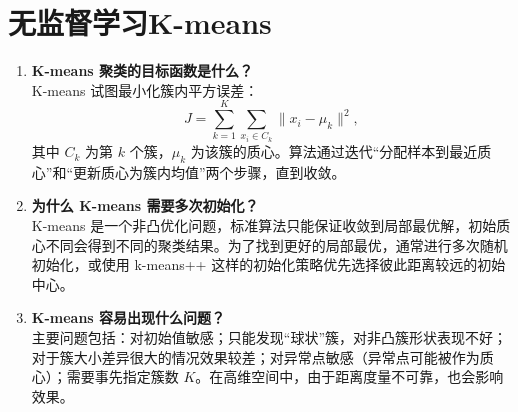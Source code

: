 \documentclass{article}
\begin{document}
\section{无监督学习K-means}
\begin{enumerate}
\item \textbf{K-means 聚类的目标函数是什么？}\\
K-means 试图最小化簇内平方误差：
\[
J = \sum_{k=1}^K \sum_{x_i \in C_k} \|x_i - \mu_k\|^2,
\]
其中 $C_k$ 为第 $k$ 个簇，$\mu_k$ 为该簇的质心。算法通过迭代“分配样本到最近质心”和“更新质心为簇内均值”两个步骤，直到收敛。

\item \textbf{为什么 K-means 需要多次初始化？}\\
K-means 是一个非凸优化问题，标准算法只能保证收敛到局部最优解，初始质心不同会得到不同的聚类结果。为了找到更好的局部最优，通常进行多次随机初始化，或使用 k-means++ 这样的初始化策略优先选择彼此距离较远的初始中心。

\item \textbf{K-means 容易出现什么问题？}\\
主要问题包括：对初始值敏感；只能发现“球状”簇，对非凸簇形状表现不好；对于簇大小差异很大的情况效果较差；对异常点敏感（异常点可能被作为质心）；需要事先指定簇数 $K$。在高维空间中，由于距离度量不可靠，也会影响效果。
\end{enumerate}
\end{document}
